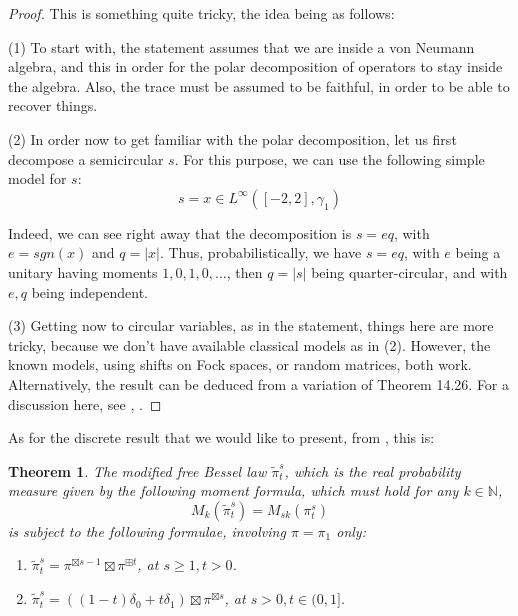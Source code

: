 \documentclass[12pt]{amsbook}
\newtheorem{theorem}{Theorem}[chapter]
\begin{document}
\begin{proof}
This is something quite tricky, the idea being as follows:

\medskip

(1) To start with, the statement assumes that we are inside a von Neumann algebra, and this in order for the polar decomposition of operators to stay inside the algebra. Also, the trace must be assumed to be faithful, in order to be able to recover things.

\medskip

(2) In order now to get familiar with the polar decomposition, let us first decompose a semicircular $s$. For this purpose, we can use the following simple model for $s$:
$$s=x\in L^\infty\left([-2,2],\gamma_1\right)$$

Indeed, we can see right away that the decomposition is $s=eq$, with $e=sgn(x)$ and $q=|x|$. Thus, probabilistically, we have $s=eq$, with $e$ being a unitary having moments $1,0,1,0,\ldots$, then $q=|s|$ being quarter-circular, and with $e,q$ being independent. 

\medskip

(3) Getting now to circular variables, as in the statement, things here are more tricky, because we don't have available classical models as in (2). However, the known models, using shifts on Fock spaces, or random matrices, both work. Alternatively, the result can be deduced from a variation of Theorem 14.26. For a discussion here, see \cite{nsp}, \cite{vo3}.
\end{proof}

As for the discrete result that we would like to present, from \cite{bb+}, this is:

\begin{theorem}
The modified free Bessel law $\tilde{\pi}^s_t$, which is the real probability measure given by the following moment formula, which must hold for any $k\in\mathbb N$,
$$M_k(\tilde{\pi}^s_t)=M_{sk}(\pi^s_t)$$
is subject to the following formulae, involving $\pi=\pi_1$ only:
\begin{enumerate}
\item $\tilde{\pi}^s_t=\pi^{\boxtimes s-1}\boxtimes\pi^{\boxplus t}$, at $s\geq1,t>0$.

\item $\tilde{\pi}^s_t=((1-t)\delta_0+t\delta_1)\boxtimes\pi^{\boxtimes s}$, at $s>0,t\in(0,1]$.
\end{enumerate}
\end{theorem}
\end{document}
